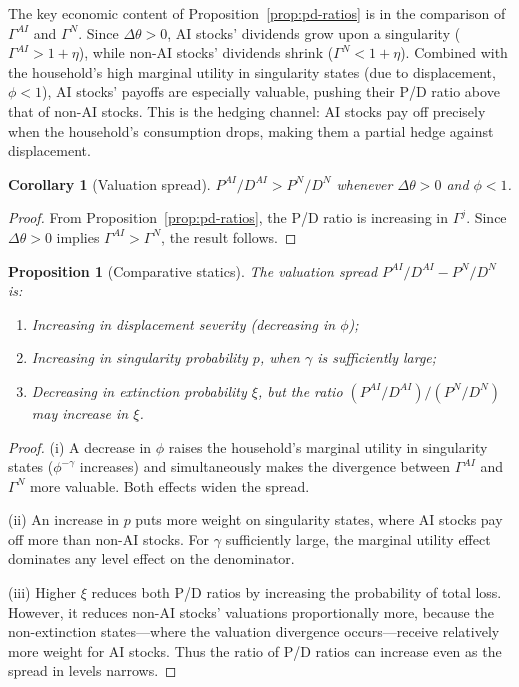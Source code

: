 \documentclass[12pt]{article}
\newtheorem{proposition}{Proposition}
\newtheorem{corollary}{Corollary}
\begin{document}
The key economic content of Proposition~\ref{prop:pd-ratios} is in the comparison of $\Gamma^{AI}$ and $\Gamma^{N}$. Since $\Delta\theta > 0$, AI stocks' dividends grow upon a singularity ($\Gamma^{AI} > 1+\eta$), while non-AI stocks' dividends shrink ($\Gamma^{N} < 1+\eta$). Combined with the household's high marginal utility in singularity states (due to displacement, $\phi < 1$), AI stocks' payoffs are especially valuable, pushing their P/D ratio above that of non-AI stocks. This is the hedging channel: AI stocks pay off precisely when the household's consumption drops, making them a partial hedge against displacement.

\begin{corollary}[Valuation spread] \label{cor:spread} %
$P^{AI}/D^{AI} > P^N/D^N$ whenever $\Delta\theta > 0$ and $\phi < 1$.
\end{corollary}

\begin{proof}
From Proposition~\ref{prop:pd-ratios}, the P/D ratio is increasing in $\Gamma^j$. Since $\Delta\theta > 0$ implies $\Gamma^{AI} > \Gamma^N$, the result follows.
\end{proof}

\begin{proposition}[Comparative statics] \label{prop:comp-statics} %
The valuation spread $P^{AI}/D^{AI} - P^N/D^N$ is:
\begin{enumerate}
\item[(i)] Increasing in displacement severity (decreasing in $\phi$);
\item[(ii)] Increasing in singularity probability $p$, when $\gamma$ is sufficiently large;
\item[(iii)] Decreasing in extinction probability $\xi$, but the \emph{ratio} $(P^{AI}/D^{AI}) / (P^N/D^N)$ may increase in $\xi$.
\end{enumerate}
\end{proposition}

\begin{proof}
(i) A decrease in $\phi$ raises the household's marginal utility in singularity states ($\phi^{-\gamma}$ increases) and simultaneously makes the divergence between $\Gamma^{AI}$ and $\Gamma^{N}$ more valuable. Both effects widen the spread.

(ii) An increase in $p$ puts more weight on singularity states, where AI stocks pay off more than non-AI stocks. For $\gamma$ sufficiently large, the marginal utility effect dominates any level effect on the denominator.

(iii) Higher $\xi$ reduces both P/D ratios by increasing the probability of total loss. However, it reduces non-AI stocks' valuations proportionally more, because the non-extinction states---where the valuation divergence occurs---receive relatively more weight for AI stocks. Thus the ratio of P/D ratios can increase even as the spread in levels narrows.
\end{proof}
\end{document}
